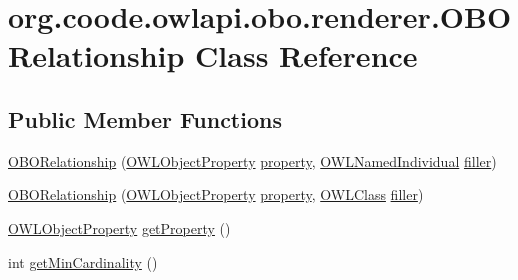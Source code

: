 \hypertarget{classorg_1_1coode_1_1owlapi_1_1obo_1_1renderer_1_1_o_b_o_relationship}{\section{org.\-coode.\-owlapi.\-obo.\-renderer.\-O\-B\-O\-Relationship Class Reference}
\label{classorg_1_1coode_1_1owlapi_1_1obo_1_1renderer_1_1_o_b_o_relationship}
}
\subsection*{Public Member Functions}
\begin{DoxyCompactItemize}
\item 
\hyperlink{classorg_1_1coode_1_1owlapi_1_1obo_1_1renderer_1_1_o_b_o_relationship_ac42af68d86f22cddf076a01bcc96e2b1}{O\-B\-O\-Relationship} (\hyperlink{interfaceorg_1_1semanticweb_1_1owlapi_1_1model_1_1_o_w_l_object_property}{O\-W\-L\-Object\-Property} \hyperlink{classorg_1_1coode_1_1owlapi_1_1obo_1_1renderer_1_1_o_b_o_relationship_aa7d4cc9608d41ce5b7e0067003e111cf}{property}, \hyperlink{interfaceorg_1_1semanticweb_1_1owlapi_1_1model_1_1_o_w_l_named_individual}{O\-W\-L\-Named\-Individual} \hyperlink{classorg_1_1coode_1_1owlapi_1_1obo_1_1renderer_1_1_o_b_o_relationship_a5a6744811d7a1731572630bd88df198a}{filler})
\item 
\hyperlink{classorg_1_1coode_1_1owlapi_1_1obo_1_1renderer_1_1_o_b_o_relationship_ab4b0c82c23b9fe200a32b8e6be598fe0}{O\-B\-O\-Relationship} (\hyperlink{interfaceorg_1_1semanticweb_1_1owlapi_1_1model_1_1_o_w_l_object_property}{O\-W\-L\-Object\-Property} \hyperlink{classorg_1_1coode_1_1owlapi_1_1obo_1_1renderer_1_1_o_b_o_relationship_aa7d4cc9608d41ce5b7e0067003e111cf}{property}, \hyperlink{interfaceorg_1_1semanticweb_1_1owlapi_1_1model_1_1_o_w_l_class}{O\-W\-L\-Class} \hyperlink{classorg_1_1coode_1_1owlapi_1_1obo_1_1renderer_1_1_o_b_o_relationship_a5a6744811d7a1731572630bd88df198a}{filler})
\item 
\hyperlink{interfaceorg_1_1semanticweb_1_1owlapi_1_1model_1_1_o_w_l_object_property}{O\-W\-L\-Object\-Property} \hyperlink{classorg_1_1coode_1_1owlapi_1_1obo_1_1renderer_1_1_o_b_o_relationship_a4b3c1bc947493015148e82e558915569}{get\-Property} ()
\item 
int \hyperlink{classorg_1_1coode_1_1owlapi_1_1obo_1_1renderer_1_1_o_b_o_relationship_a28924fcd0cd292a5c10ee5c66de26879}{get\-Min\-Cardinality} ()

\end{DoxyCompactItemize}

